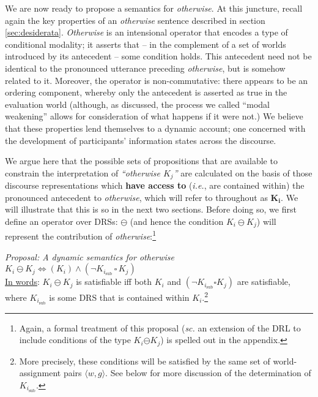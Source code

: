 We are now ready to propose a semantics for \textit{otherwise}. At this juncture, recall again the key properties of an \textit{otherwise} sentence described in section \ref{sec:desiderata}. \textit{Otherwise} is an intensional operator that encodes a type of conditional modality; it asserts that -- in the complement of a set of worlds introduced by its antecedent -- some condition holds. This antecedent need not be identical to the pronounced utterance preceding \textit{otherwise}, but is somehow related to it. Moreover, the operator is non-commutative: there appears to be an ordering component, whereby only the antecedent is asserted as true in the evaluation world (although, as discussed, the process we called ``modal weakening'' allows for consideration of what happens if it were not.) We believe that these properties lend themselves to a dynamic account; one concerned with the development of participants' information states across the discourse.%


We argue here that the possible sets of propositions that are available to constrain the interpretation of \textit{``otherwise $ K_j $''} are calculated on the basis of those discourse representations which \textbf{have access to} (\textit{i.e.}, are contained within) the pronounced antecedent to \textit{otherwise}, which will refer to throughout as $ \boldsymbol{K_i} $.
We will illustrate that this is so in the next two sections. Before doing so, we first define an operator over DRSs: $ \ominus $ (and hence the condition $ K_i\ominus K_j$) will represent the contribution of \textit{otherwise}:\footnote{Again, a formal treatment of this proposal (\textit{sc.} an extension of the DRL to include conditions of the type $ K_i\boldsymbol\ominus K_j $) is spelled out in the appendix.}

\pex   \label{otherwise-complex} \textit{Proposal: A dynamic semantics for \emph{otherwise}}\\
$ K_i\ominus K_j\iff (K_i) \wedge (\neg K_{i_{\text{sub}}}\,\square\,K_j) $\\
\uline{In words}: $ K_{i}\ominus K_j$ is satisfiable iff both $ K_i $ and $ (\neg K_{i_{\text{sub}}}\square K_j)$ are satisfiable, where $K_{i_{\text{sub}}}$ is some DRS that is contained within $K_{i}$.\footnote{More precisely, these  conditions will be satisfied by the same set of world-assignment pairs $ \langle w,g\rangle $. See below for more discussion of the determination of $K_{i_{\text{sub}}} $.\label{caveat-type}}\xe

